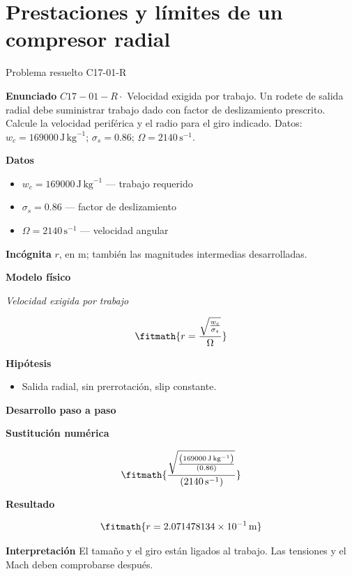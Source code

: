 \documentclass[10pt,openany]{book}
\begin{document}
\chapter{Prestaciones y límites de un compresor radial}
\begin{studiumworked}{Problema resuelto C17-01-R}


\noindent\textbf{Enunciado}
\(C17-01-R \cdot\) Velocidad exigida por trabajo. Un rodete de salida radial debe suministrar trabajo dado con factor de deslizamiento prescrito. Calcule la velocidad periférica y el radio para el giro indicado. Datos: \(w_c=169000\, \mathrm{J}\,\mathrm{kg}^{-1}\); \(\sigma_s=0.86\); \(\Omega=2140\, \mathrm{s}^{-1}\).

\noindent\textbf{Datos}
\begin{itemize}
\item $w_c = 169000\,\mathrm{J}\,\mathrm{kg}^{-1}$ — trabajo requerido
\item $\sigma_s = 0.86$ — factor de deslizamiento
\item $\Omega = 2140\,\mathrm{s}^{-1}$ — velocidad angular
\end{itemize}

\noindent\textbf{Incógnita}
$r$, en $\mathrm{m}$; también las magnitudes intermedias desarrolladas.

\noindent\textbf{Modelo físico}

\noindent\textit{Velocidad exigida por trabajo}

\[
\fitmath{r=\frac{\sqrt{\frac{w_c}{\sigma_s}}}{\Omega}}
\]

\noindent\textbf{Hipótesis}
\begin{itemize}
\item Salida radial, sin prerrotación, slip constante.
\end{itemize}

\noindent\textbf{Desarrollo paso a paso}



\noindent\textbf{Sustitución numérica}

\[
\fitmath{\frac{\sqrt{\frac{\left(169000\,\mathrm{J}\,\mathrm{kg}^{-1}\right)}{\left(0.86\right)}}}{\left(2140\,\mathrm{s}^{-1}\right)}}
\]

\noindent\textbf{Resultado}

\[
\fitmath{r=2.071478134\times10^{-1}\,\mathrm{m}}
\]

\noindent\textbf{Interpretación}
El tamaño y el giro están ligados al trabajo. Las tensiones y el Mach deben comprobarse después.


\end{studiumworked}
\end{document}
